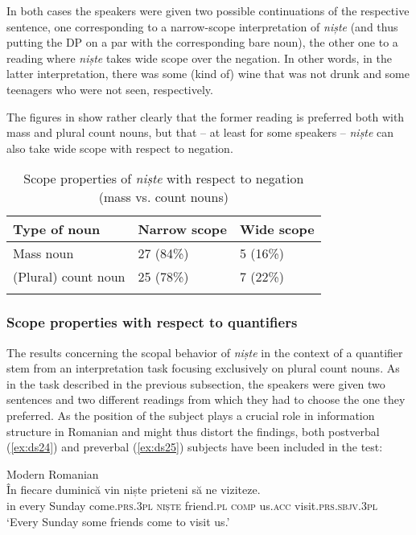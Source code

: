 \documentclass[output=paper,colorlinks,citecolor=brown]{langscibook}
\begin{document}
In both cases the speakers were given two possible continuations of the respective sentence, one corresponding to a narrow-scope interpretation of \textit{niște} (and thus putting the DP on a par with the corresponding bare noun), the other one to a reading where \textit{niște} takes wide scope over the negation. In other words, in the latter interpretation, there was some (kind of) wine that was not drunk and some teenagers who were not seen, respectively.

The figures in  show rather clearly that the former reading is preferred both with mass and plural count nouns, but that -- at least for some speakers -- \textit{niște} can also take wide scope with respect to negation.

\begin{table}
\begin{tabular}{lll}
\lsptoprule
Type of noun & Narrow scope & Wide scope\\
\midrule
Mass noun & 27 (84\%) & 5 (16\%)\\
(Plural) count noun & 25 (78\%) & 7 (22\%)\\
\lspbottomrule
\end{tabular}
\caption{Scope properties of \textit{niște} with respect to negation (mass vs. count nouns)}
\label{tab:ds5}
\end{table}

\subsubsection{Scope properties with respect to quantifiers}\label{sec:ds4.4.2}
The results concerning the scopal behavior of \textit{niște} in the context of a quantifier stem from an interpretation task focusing exclusively on plural count nouns. As in the task described in the previous subsection, the speakers were given two sentences and two different readings from which they had to choose the one they preferred. As the position of the subject plays a crucial role in information structure in Romanian \citep[cf.][902]{Leonetti2017} and might thus distort the findings, both postverbal (\ref{ex:ds24}) and preverbal (\ref{ex:ds25}) subjects have been included in the test:

\ea\label{ex:ds24} Modern Romanian\\
\gll   \^{I}n fiecare duminic\u{a} vin niște prieteni s\u{a} ne viziteze.\\
     in every Sunday come.\textsc{prs.}3\textsc{pl} \textsc{niște} friend.\textsc{pl} \textsc{comp} us.\textsc{acc} visit.\textsc{prs}.\textsc{sbjv}.3\textsc{pl}\\
\glt ‘Every Sunday some friends come to visit us.’
\z
\end{document}
